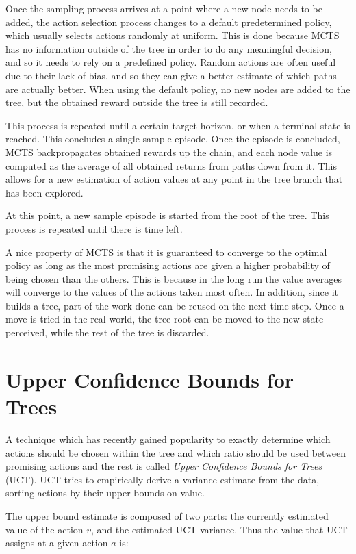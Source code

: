 Once the sampling process arrives at a point where a new node needs to be added, the action
selection process changes to a default predetermined policy, which usually selects actions randomly
at uniform. This is done because MCTS has no information outside of the tree in order to do any
meaningful decision, and so it needs to rely on a predefined policy. Random actions are often useful
due to their lack of bias, and so they can give a better estimate of which paths are actually better.
When using the default policy, no new nodes are added to the tree, but the obtained reward outside
the tree is still recorded.

This process is repeated until a certain target horizon, or when a terminal state is reached. This
concludes a single sample episode. Once the episode is concluded, MCTS backpropagates obtained
rewards up the chain, and each node value is computed as the average of all obtained returns from
paths down from it. This allows for a new estimation of action values at any point in the tree
branch that has been explored.

At this point, a new sample episode is started from the root of the tree. This process is repeated
until there is time left.

A nice property of MCTS is that it is guaranteed to converge to the optimal policy as long as the
most promising actions are given a higher probability of being chosen than the others. This is
because in the long run the value averages will converge to the values of the actions taken most
often.  In addition, since it builds a tree, part of the work done can be reused on the next time
step. Once a move is tried in the real world, the tree root can be moved to the new state perceived,
while the rest of the tree is discarded.


\section{Upper Confidence Bounds for Trees}

A technique which has recently gained popularity to exactly determine which actions should be chosen
within the tree and which ratio should be used between promising actions and the rest is called
\textit{Upper Confidence Bounds for Trees} (UCT). UCT tries to empirically derive a variance
estimate from the data, sorting actions by their upper bounds on value.

The upper bound estimate is composed of two parts: the currently estimated value of the action $v$,
and the estimated UCT variance. Thus the value that UCT assigns at a given action $a$ is:

